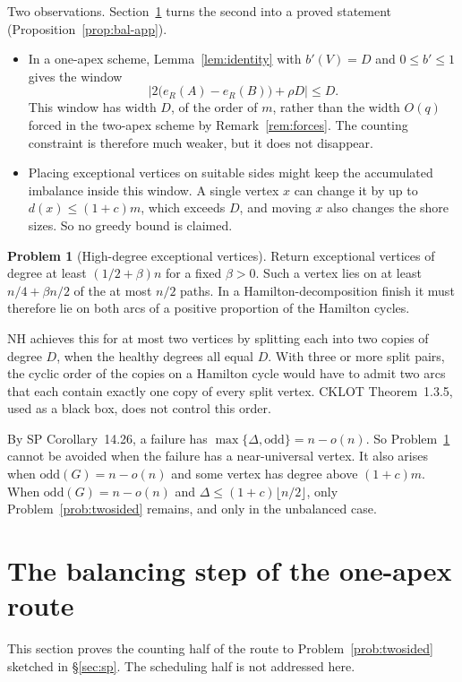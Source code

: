 \documentclass[11pt]{article}
\theoremstyle{definition}
\newtheorem{problem}[theorem]{Problem}
\newcommand{\odd}{\mathrm{odd}}
\begin{document}
Two observations. Section~\ref{sec:balance} turns the second into a proved statement (Proposition~\ref{prop:bal-app}).
\begin{itemize}[nosep]
\item In a one-apex scheme, Lemma~\ref{lem:identity} with $b'(V)=D$ and $0\le b'\le1$ gives the window
\[
\bigl|2\bigl(e_R(A)-e_R(B)\bigr)+\rho D\bigr|\le D .
\]
This window has width $D$, of the order of $m$, rather than the width $O(q)$ forced in the two-apex scheme by Remark~\ref{rem:forces}. The counting constraint is therefore much weaker, but it does not disappear.
\item Placing exceptional vertices on suitable sides might keep the accumulated imbalance inside this window. A single vertex $x$ can change it by up to $d(x)\le(1+c)m$, which exceeds $D$, and moving $x$ also changes the shore sizes. So no greedy bound is claimed.
\end{itemize}

\begin{problem}[High-degree exceptional vertices]\label{prob:high}
Return exceptional vertices of degree at least $(1/2+\beta)n$ for a fixed $\beta>0$. Such a vertex lies on at least $n/4+\beta n/2$ of the at most $n/2$ paths. In a Hamilton-decomposition finish it must therefore lie on both arcs of a positive proportion of the Hamilton cycles.

NH achieves this for at most two vertices by splitting each into two copies of degree $D$, when the healthy degrees all equal $D$. With three or more split pairs, the cyclic order of the copies on a Hamilton cycle would have to admit two arcs that each contain exactly one copy of every split vertex. CKLOT Theorem~1.3.5, used as a black box, does not control this order.
\end{problem}

By SP Corollary~14.26, a failure has $\max\{\Delta,\odd\}=n-o(n)$. So Problem~\ref{prob:high} cannot be avoided when the failure has a near-universal vertex. It also arises when $\odd(G)=n-o(n)$ and some vertex has degree above $(1+c)m$. When $\odd(G)=n-o(n)$ and $\Delta\le(1+c)\lfloor n/2\rfloor$, only Problem~\ref{prob:twosided} remains, and only in the unbalanced case.

\section{The balancing step of the one-apex route}\label{sec:balance}

This section proves the counting half of the route to Problem~\ref{prob:twosided} sketched in \S\ref{sec:sp}. The scheduling half is not addressed here.
\end{document}

